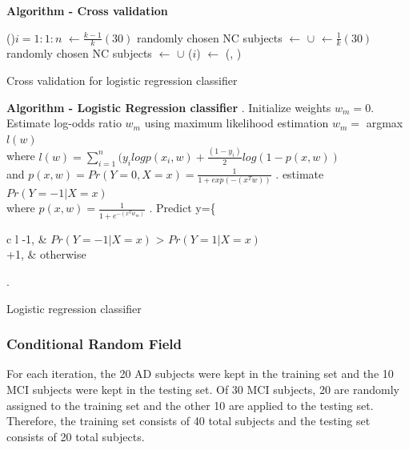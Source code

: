 \documentclass{article}  %
\begin{document}
\begin{algorithm}{\textbf{Algorithm - Cross validation}}{
    \label{algo:cv_logistic}
}


\Blankline\;
\For(){$i = 1:1:n$}
{
\NCtrain $\leftarrow \frac{k-1}{k}(30)$ randomly chosen NC subjects\;
\trainingGroup $\leftarrow $ \AD $\cup$ \NCtrain {}\label{cmt}\;
\NCtest $\leftarrow \frac{1}{k}(30)$ randomly chosen NC subjects\;
\testingGroup  $\leftarrow $ \AD $\cup$ \NCtest {}\label{cmt}\;
\results($i$) $\leftarrow$ \RunLogisticRegressionClassifier (\trainingGroup, \testingGroup)\;
}
\Blankline
\caption{Cross validation for logistic regression classifier}
\end{algorithm}


\begin{algorithm}{\textbf{Algorithm - Logistic Regression classifier}}{
    \label{algo:logistic}}
\;
\;
\Indp{}. Initialize weights $w_m = 0$. Estimate log-odds ratio $w_m$ using maximum likelihood estimation\;
$w_m =$ argmax $l(w)$ \\
\Indp
where $l(w) = \sum_{i=1}^{n} (y_i log p(x_i, w) + \frac{(1-y_i)}{2} log (1 - p(x,w))$\\
and $p(x,w) = Pr(Y = 0, X = x) = \frac{1}{1 + exp(-(x^T w))}$ \;
\Indm
\Indm\Indm
{}
\Indp{}. estimate $Pr(Y = -1 | X = x)$ \\
\Indp\Indp where $p(x,w)  = \frac{1}{1 + e^{-(x^T w_m)}} $\;
\Indm{}. Predict y=\left\{
\begin{array}{c l}      
    -1, & $Pr(Y = -1 | X=x)$ > $ Pr(Y=1 | X=x)$\\
    +1, & otherwise
\end{array}\right.

\Indm\Indm
\Blankline
\caption{Logistic regression classifier}
\end{algorithm}


\subsubsection{Conditional Random Field}
For each iteration, the 20 AD subjects were kept in the training set and the 10 MCI subjects were kept in the testing set. Of 30 MCI subjects, 20 are randomly assigned to the training set and the other 10 are applied to the testing set. Therefore, the training set consists of 40 total subjects and the testing set consists of 20 total subjects.
\end{document}
